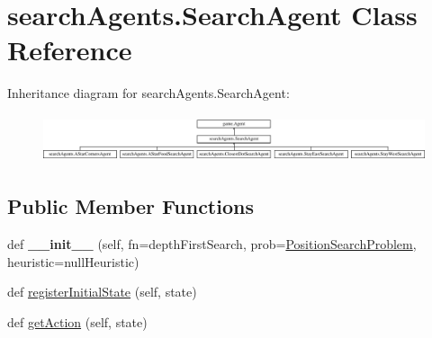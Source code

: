 \hypertarget{classsearch_agents_1_1_search_agent}{}\section{search\+Agents.\+Search\+Agent Class Reference}
\label{classsearch_agents_1_1_search_agent}
Inheritance diagram for search\+Agents.\+Search\+Agent\+:\begin{figure}[H]
\begin{center}
\leavevmode
\includegraphics[height=1.417722cm]{classsearch_agents_1_1_search_agent}
\end{center}
\end{figure}
\subsection*{Public Member Functions}
\begin{DoxyCompactItemize}
\item 
\mbox{\label{classsearch_agents_1_1_search_agent_ace72a2a8f3cd7baa33341b58d098f0a9}} 
def {\bfseries \+\_\+\+\_\+init\+\_\+\+\_\+} (self, fn=\textquotesingle{}depth\+First\+Search\textquotesingle{}, prob=\textquotesingle{}\hyperlink{classsearch_agents_1_1_position_search_problem}{Position\+Search\+Problem}\textquotesingle{}, heuristic=\textquotesingle{}null\+Heuristic\textquotesingle{})
\item 
def \hyperlink{classsearch_agents_1_1_search_agent_ab6fba6e09d2d604f1f1f403dc41ecfcc}{register\+Initial\+State} (self, state)
\item 
def \hyperlink{classsearch_agents_1_1_search_agent_a93ab497b5d38054a8aa628c2a2339d13}{get\+Action} (self, state)
\end{DoxyCompactItemize}
